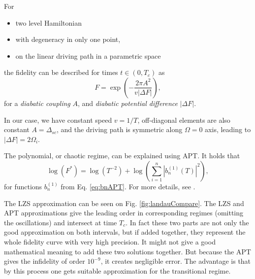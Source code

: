 \begin{thm}
    For 
    \begin{itemize}
        \item two level Hamiltonian
        \item with degeneracy in only one point,
        \item on the linear driving path in a parametric space
    \end{itemize}
    the fidelity can be described for times $t\in(0,T_c)$ as
    \begin{equation}
        F = \exp\left(-\frac{2 \pi A^2}{v|\Delta F|}\right),
        \label{eq:exponentialPart}
    \end{equation}
    for a \emph{diabatic coupling} $A$, and \emph{diabatic potential difference} $|\Delta F|$. 
\end{thm}

In our case, we have constant speed $v=1/T$, off-diagonal elements are also constant $A=\Delta_{sc}$, and the driving path is symmetric along $\Omega=0$ axis, leading to $|\Delta F|=2\Omega_i$.

The polynomial, or chaotic regime, can be explained using APT. It holds that
\begin{equation}
    \log(F^*)=\log(T^{-2})+\log\left(\sum_{i=1}^n |b_n^{(1)}(T)|^2\right),
    \label{eq:polynomialPart}
\end{equation}
for functions $b_n^{(1)}$ from Eq. \ref{eq:bnAPT}. For more details, see \cite{felipe}.

The LZS approximation can be seen on Fig. \ref{fig:landauCompare}. The LZS and APT approximations give the leading order in corresponding regimes (omitting the oscillations) and intersect at time $T_c$. In fact these two parts are not only the good approximation on both intervals, but if added together, they represent the whole fidelity curve with very high precision. It might not give a good mathematical meaning to add these two solutions together. But because the APT gives the infidelity of order $10^{-9}$, it creates negligible error. The advantage is that by this process one gets suitable approximation for the transitional regime.


